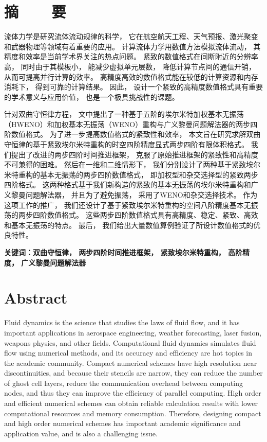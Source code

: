 \chapter{摘~~~~要}
\song{}

流体力学是研究流体流动规律的科学，
它在航空航天工程、天气预报、激光聚变和武器物理等领域有着重要的应用。
计算流体力学用数值方法模拟流体流动，
其精度和效率是当前学术界关注的热点问题。
紧致的数值格式在间断附近的分辨率高，
同时由于其模板小，
能减少虚拟单元层数，
降低计算节点间的通信开销，
从而可提高并行计算的效率。
高精度高效的数值格式能在较低的计算资源和内存消耗下，
得到可靠的计算结果。
因此，
设计一个紧致的高精度数值格式具有重要的学术意义与应用价值，
也是一个极具挑战性的课题。

针对双曲守恒律方程，
文\cite{du2018hermite}中提出了一种基于五阶的埃尔米特加权基本无振荡（HWENO）和加权基本无振荡（WENO）重构与广义黎曼问题解法器的两步四阶数值格式。
为了进一步提高数值格式的紧致性和效率，
本文旨在研究求解双曲守恒律的基于紧致埃尔米特重构的时空四阶精度显式两步四阶有限体积格式。
我们提出了改进的两步四阶时间推进框架，
克服了原始推进框架的紧致性和高精度不可兼得的困难。
然后在一维和二维情形下，
我们分别设计了两种基于紧致埃尔米特重构的基本无振荡的两步四阶数值格式，
即加权型和杂交选择型的紧致两步四阶格式。
这两种格式基于我们新构造的紧致的基本无振荡的埃尔米特重构和广义黎曼问题解法器，
并且为了避免振荡，
采用了WENO和杂交选择技术。
作为这项工作的推广，
我们还设计了基于紧致埃尔米特重构的空间八阶精度基本无振荡的两步四阶数值格式。
这些两步四阶数值格式具有高精度、稳定、紧致、高效和基本无振荡的特点。
最后，
我们给出大量数值算例验证了所设计数值格式的优良特性。

\vspace{\baselineskip}\hangindent=50pt\noindent
{\bfseries\xiaosi\song 关键词：双曲守恒律，
  两步四阶时间推进框架，
  紧致埃尔米特重构，
  高阶精度，
  广义黎曼问题解法器}

\chapter{Abstract}

Fluid dynamics is the science that studies the laws of fluid flow,
and it has important applications in aerospace engineering,
weather forecasting,
laser fusion,
weapons physics,
and other fields.
Computational fluid dynamics simulates fluid flow using numerical methods,
and its accuracy and efficiency are hot topics in the academic community.
Compact numerical schemes have high resolution near discontinuities,
and because their stencils are narrow,
they can reduce the number of ghost cell layers,
reduce the communication overhead between computing nodes,
and thus they can improve the efficiency of parallel computing.
High order and efficient numerical schemes can obtain reliable calculation results with lower computational resources and memory consumption.
Therefore,
designing compact and high order numerical schemes has important academic significance and application value,
and is also a challenging issue.

